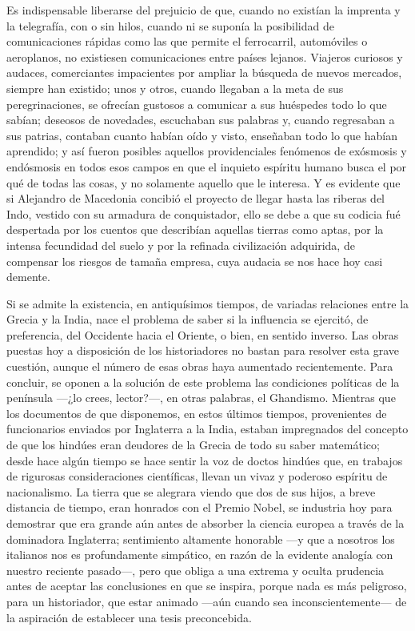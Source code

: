 \documentclass[a4paper, 12pt, draft]{article}
\begin{document}
{Es indispensable liberarse del prejuicio de que, cuando no existían la imprenta y la telegrafía, con o sin hilos, cuando ni se suponía la posibilidad de comunicaciones rápidas como las que permite el ferrocarril, automóviles o aeroplanos, no existiesen comunicaciones entre países lejanos. Viajeros curiosos y audaces, comerciantes impacientes por ampliar la búsqueda de nuevos mercados, siempre han existido; unos y otros, cuando llegaban a la meta de sus peregrinaciones, se ofrecían gustosos a comunicar a sus huéspedes todo lo que sabían; deseosos de novedades, escuchaban sus palabras y, cuando regresaban a sus patrias, contaban cuanto habían oído y visto, enseñaban todo lo que habían aprendido; y así fueron posibles aquellos providenciales fenómenos de exósmosis y endósmosis en todos esos campos en que el inquieto espíritu humano busca el por qué de todas las cosas, y no solamente aquello que le interesa. Y es evidente que si Alejandro de Macedonia concibió el proyecto de llegar hasta las riberas del Indo, vestido con su armadura de conquistador, ello se debe a que su codicia fué despertada por los cuentos que describían aquellas tierras como aptas, por la intensa fecundidad del suelo y por la refinada civilización adquirida, de compensar los riesgos de tamaña empresa, cuya audacia se nos hace hoy casi demente.

Si se admite la existencia, en antiquísimos tiempos, de variadas relaciones entre la Grecia y la India, nace el problema de saber si la influencia se ejercitó, de preferencia, del Occidente hacia el Oriente, o bien, en sentido inverso. Las obras puestas hoy a disposición de los historiadores no bastan para resolver esta grave cuestión, aunque el número de esas obras haya aumentado recientemente. Para concluir, se oponen a la solución de este problema las condiciones políticas de la península ---¿lo crees, lector?---, en otras palabras, el Ghandismo. Mientras que los documentos de que disponemos, en estos últimos tiempos, provenientes de funcionarios enviados por Inglaterra a la India, estaban impregnados del concepto de que los hindúes eran deudores de la Grecia de todo  su saber matemático; desde hace algún tiempo se hace sentir la voz de doctos hindúes que, en trabajos de rigurosas consideraciones científicas, llevan un vivaz y poderoso espíritu de nacionalismo. La tierra que se alegrara viendo que dos de sus hijos, a breve distancia de
tiempo, eran honrados con el Premio Nobel, se industria hoy para demostrar que era grande aún antes de absorber la ciencia europea a través de la dominadora Inglaterra; sentimiento altamente honorable ---y que a nosotros los italianos nos es profundamente simpático, en razón de la evidente analogía con nuestro reciente pasado---, pero que obliga a una extrema y oculta prudencia antes de aceptar las conclusiones en que se inspira, porque nada es más peligroso, para un historiador, que estar animado ---aún cuando sea inconscientemente--- de la aspiración de establecer una tesis
preconcebida.

}
\end{document}
